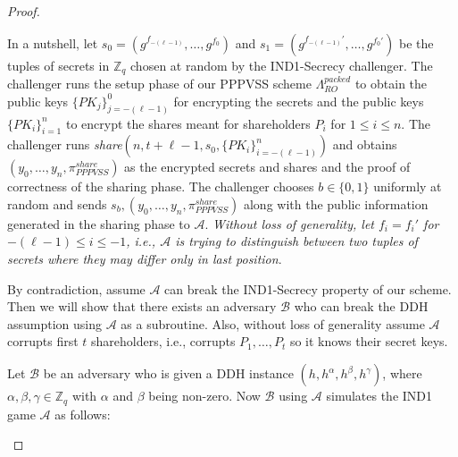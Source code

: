 \begin{proof}
\begin{itemize}
      In a nutshell, let $s_0=(g^{f_{-(\ell-1)}},\dots,g^{f_0})$ and $s_1=(g^{f_{-(\ell-1)}'},\dots,g^{f_0'})$ 
      be the tuples of secrets in $\mathbb{Z}_q$ chosen at random by the IND1-Secrecy challenger. The 
      challenger runs the setup phase of our PPPVSS scheme $\Lambda_{RO}^{packed}$ to obtain the 
      public keys $\{PK_j\}_{j=-(\ell-1)}^0$ for encrypting the secrets and the public keys 
      $\{PK_i\}_{i=1}^n$ to encrypt the shares meant for shareholders $P_i$ for 
      $1\leq i\leq n$. The challenger runs \textit{share}$(n,t+\ell-1,s_0,\{PK_i\}_{i=-(\ell-1)}^n)$ 
      and obtains $(y_0,\dots,y_n,\pi_{PPPVSS}^{share})$ as the encrypted secrets and shares and 
      the proof of correctness of the sharing phase. The challenger chooses $b\in\{0,1\}$ uniformly at 
      random and sends $s_b,(y_0,\dots,y_n,\pi_{PPPVSS}^{share})$ along with the public information generated in 
      the sharing phase to $\mathcal{A}$. \textit{Without loss of generality, let $f_i=f_i'$ for 
      $-(\ell-1)\leq i\leq -1$, i.e., $\mathcal{A}$ is trying to distinguish between two tuples of 
      secrets where they may differ only in last position}.\par

      By contradiction, assume $\mathcal{A}$ can break the IND1-Secrecy property 
      of our scheme. Then we will show that there exists an adversary $\mathcal{B}$ who can 
      break the DDH assumption using $\mathcal{A}$ as a subroutine. Also, without loss of 
      generality assume $\mathcal{A}$ corrupts first $t$ shareholders, i.e., corrupts 
      $P_1,\dots,P_t$ so it knows their secret keys.\par

      Let $\mathcal{B}$ be an adversary who is given a DDH instance $(h,h^\alpha,h^\beta,h^\gamma)$, 
      where $\alpha,\beta,\gamma\in\mathbb{Z}_q$ with $\alpha$ and $\beta$ being non-zero. 
      Now $\mathcal{B}$ using $\mathcal{A}$ simulates the IND1 game $\mathcal{A}$ as follows:


\end{itemize}
\end{proof}
